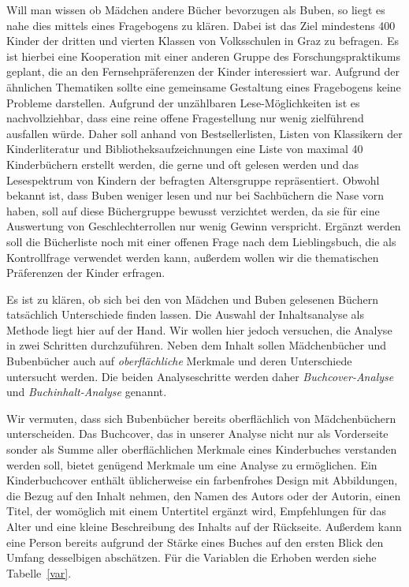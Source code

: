 
    Will man wissen ob Mädchen andere Bücher bevorzugen als Buben, so liegt es
    nahe dies mittels eines Fragebogens zu klären. Dabei ist das Ziel mindestens
    400 Kinder der dritten und vierten Klassen von Volksschulen in Graz zu
    befragen. Es ist hierbei eine Kooperation mit einer anderen Gruppe des
    Forschungspraktikums geplant, die an den Fernsehpräferenzen der Kinder
    interessiert war. Aufgrund der ähnlichen Thematiken sollte eine gemeinsame
    Gestaltung eines Fragebogens keine Probleme darstellen. Aufgrund der
    unzählbaren Lese-Möglichkeiten ist es nachvollziehbar, dass eine reine
    offene Fragestellung nur wenig zielführend ausfallen würde. Daher soll
    anhand von Bestsellerlisten, Listen von Klassikern der Kinderliteratur und
    Bibliotheksaufzeichnungen eine Liste von maximal 40 Kinderbüchern erstellt
    werden, die gerne und oft gelesen werden und das Lesespektrum von Kindern
    der befragten Altersgruppe repräsentiert. Obwohl bekannt ist, dass Buben
    weniger lesen und nur bei Sachbüchern die Nase vorn haben, soll auf diese
    Büchergruppe bewusst verzichtet werden, da sie für eine Auswertung von
    Geschlechterrollen nur wenig Gewinn verspricht. Ergänzt werden soll die
    Bücherliste noch mit einer offenen Frage nach dem Lieblingsbuch, die als
    Kontrollfrage verwendet werden kann, außerdem wollen wir die thematischen
    Präferenzen der Kinder erfragen.


    Es ist zu klären, ob sich bei den von Mädchen und Buben gelesenen Büchern
    tatsächlich Unterschiede finden lassen. Die Auswahl der Inhaltsanalyse als
    Methode liegt hier auf der Hand. Wir wollen hier jedoch versuchen, die
    Analyse in zwei Schritten durchzuführen. Neben dem Inhalt sollen
    Mädchenbücher und Bubenbücher auch auf \emph{oberflächliche} Merkmale und
    deren Unterschiede untersucht werden. Die beiden Analyseschritte werden
    daher \emph{Buchcover-Analyse} und \emph{Buchinhalt-Analyse} genannt.


    Wir vermuten, dass sich Bubenbücher bereits oberflächlich von Mädchenbüchern
    unterscheiden. Das Buchcover, das in unserer Analyse nicht nur als
    Vorderseite sonder als Summe aller oberflächlichen Merkmale eines
    Kinderbuches verstanden werden soll, bietet genügend Merkmale um eine
    Analyse zu ermöglichen. Ein Kinderbuchcover enthält üblicherweise ein
    farbenfrohes Design mit Abbildungen, die Bezug auf den Inhalt nehmen, den
    Namen des Autors oder der Autorin, einen Titel, der womöglich mit einem
    Untertitel ergänzt wird, Empfehlungen für das Alter und eine kleine
    Beschreibung des Inhalts auf der Rückseite. Außerdem kann eine Person
    bereits aufgrund der Stärke eines Buches auf den ersten Blick den Umfang
    desselbigen abschätzen. Für die Variablen die Erhoben werden siehe
    Tabelle~\ref{var}.

